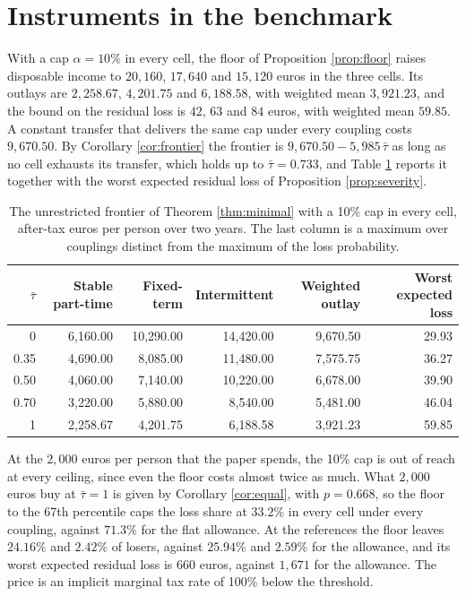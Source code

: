 \documentclass[11pt,a4paper]{article}
\theoremstyle{notesplain}
\theoremstyle{notesupright}
\numberwithin{equation}{section}
\begin{document}
\section{Instruments in the benchmark}
\label{sec:instruments}
With a cap $\alpha=10\%$ in every cell, the floor of Proposition \ref{prop:floor} raises disposable income to $20{,}160$, $17{,}640$ and $15{,}120$ euros in the three cells. Its outlays are $2{,}258.67$, $4{,}201.75$ and $6{,}188.58$, with weighted mean $3{,}921.23$, and the bound on the residual loss is $42$, $63$ and $84$ euros, with weighted mean $59.85$. A constant transfer that delivers the same cap under every coupling costs $9{,}670.50$. By Corollary \ref{cor:frontier} the frontier is $9{,}670.50-5{,}985\,\bar\tau$ as long as no cell exhausts its transfer, which holds up to $\bar\tau=0.733$, and Table \ref{tab:frontier} reports it together with the worst expected residual loss of Proposition \ref{prop:severity}.

\begin{table}[h]
\centering\small
\begin{tabular}{rrrrrr}
\toprule
$\bar\tau$ & Stable part-time & Fixed-term & Intermittent & Weighted outlay & Worst expected loss\\
\midrule
0 & 6{,}160.00 & 10{,}290.00 & 14{,}420.00 & 9{,}670.50 & 29.93\\
0.35 & 4{,}690.00 & 8{,}085.00 & 11{,}480.00 & 7{,}575.75 & 36.27\\
0.50 & 4{,}060.00 & 7{,}140.00 & 10{,}220.00 & 6{,}678.00 & 39.90\\
0.70 & 3{,}220.00 & 5{,}880.00 & 8{,}540.00 & 5{,}481.00 & 46.04\\
1 & 2{,}258.67 & 4{,}201.75 & 6{,}188.58 & 3{,}921.23 & 59.85\\
\bottomrule
\end{tabular}
\caption{The unrestricted frontier of Theorem \ref{thm:minimal} with a 10\% cap in every cell, after-tax euros per person over two years. The last column is a maximum over couplings distinct from the maximum of the loss probability.}
\label{tab:frontier}
\end{table}

At the $2{,}000$ euros per person that the paper spends, the 10\% cap is out of reach at every ceiling, since even the floor costs almost twice as much. What $2{,}000$ euros buy at $\bar\tau=1$ is given by Corollary \ref{cor:equal}, with $p=0.668$, so the floor to the 67th percentile caps the loss share at $33.2\%$ in every cell under every coupling, against $71.3\%$ for the flat allowance. At the references the floor leaves $24.16\%$ and $2.42\%$ of losers, against $25.94\%$ and $2.59\%$ for the allowance, and its worst expected residual loss is $660$ euros, against $1{,}671$ for the allowance. The price is an implicit marginal tax rate of 100\% below the threshold.
\end{document}
